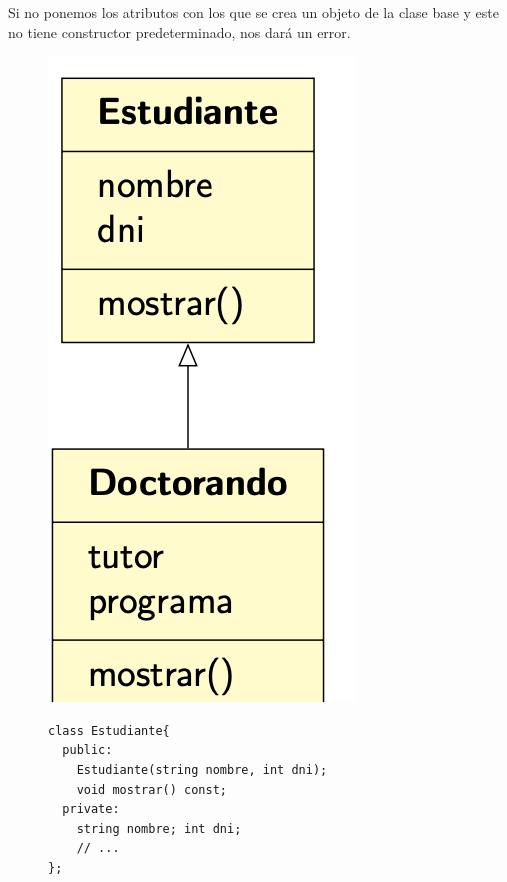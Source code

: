 Si no ponemos los atributos con los que se crea un objeto de la clase base y este no tiene constructor predeterminado, nos dará un error.
\newpage
\begin{figure}
	\begin{minipage}[t]{0.25\textwidth}
	\includegraphics[width=\textwidth]{Imagenes/gen5.png}
	\end{minipage}
\hfill
\begin{minipage}[t]{0.75\textwidth}
\vspace*{-8cm}
	\begin{lstlisting}[frame=single]
class Estudiante{
  public:
    Estudiante(string nombre, int dni);
    void mostrar() const;
  private:
    string nombre; int dni;
    // ...
};


\end{lstlisting}
\end{minipage}
\end{figure}

